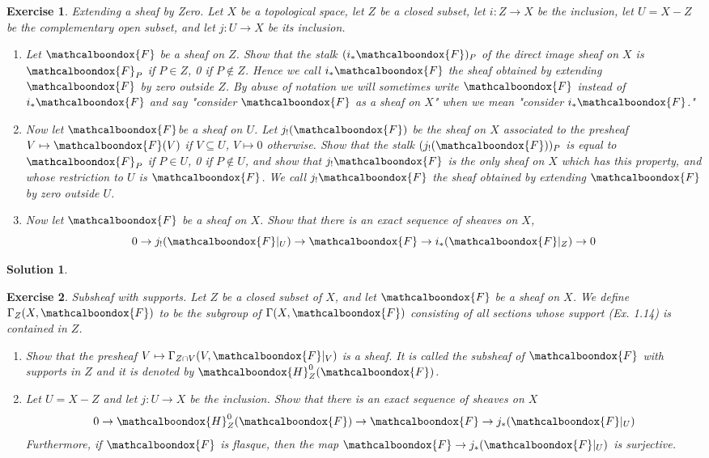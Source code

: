 \documentclass[12pt]{article}
\newtheorem{ex}{Exercise}[section]
\theoremstyle{definition}
\newtheorem*{sol}{Solution}
\newcommand{\sF}{\ensuremath{\mathcalboondox{F}}}
\newcommand{\sH}{\ensuremath{\mathcalboondox{H}}}
\begin{document}
\begin{ex}
	Extending a sheaf by Zero. Let $X$ be a topological space, let $Z$ be a closed subset, let $i: Z \to X$ be the inclusion, let $U = X-Z$ be the complementary open subset, and let $j: U \to X$ be its inclusion.

	\begin{enumerate}[label=\alph*)]
		\item Let $\sF$ be a sheaf on $Z$. Show that the stalk $(i_{*} \sF)_P$ of the direct image sheaf on $X$ is $\sF_P$ if $P \in Z$, 0 if $P \notin Z$. Hence we call $i_{*} \sF$ the sheaf obtained by extending $\sF$ by zero outside $Z$. By abuse of notation we will sometimes write $\sF$ instead of $i_{*}\sF$ and say "consider $\sF$ as a sheaf on $X$" when we mean "consider $i_{*} \sF$."

		\item Now let \sF be a sheaf on $U$. Let $j_{!}(\sF)$ be the sheaf on $X$ associated to the presheaf $V \mapsto \sF(V)$ if $V \subseteq U$, $V \mapsto 0$ otherwise. Show that the stalk $(j_{!}(\sF))_P$ is equal to $\sF_P$ if $P \in U$, 0 if $P \notin U$, and show that $j_{!}\sF$ is the only sheaf on $X$ which has this property, and whose restriction to $U$ is $\sF$. We call $j_{!}\sF$ the sheaf obtained by extending $\sF$ by zero outside $U$.

		\item Now let $\sF$ be a sheaf on $X$. Show that there is an exact sequence of sheaves on $X$,
		\[
			0 \to j_{!}(\sF|_{U}) \to \sF \to i_{*}(\sF|_{Z}) \to 0
		\]
	\end{enumerate}
\end{ex}

\begin{sol}

\end{sol}

\begin{ex}
	Subsheaf with supports. Let $Z$ be a closed subset of $X$, and let $\sF$ be a sheaf on $X$. We define $\Gamma_Z(X, \sF)$ to be the subgroup of $\Gamma(X,\sF)$ consisting of all sections whose support (Ex. 1.14) is contained in $Z$.
	\begin{enumerate}[label=\alph*)]
		\item Show that the presheaf $V \mapsto \Gamma_{Z \cap V}(V, \sF|_V)$ is a sheaf. It is called the subsheaf of $\sF$ with supports in $Z$ and it is denoted by $\sH^{0}_Z(\sF)$.

		\item Let $U = X-Z$ and let $j: U \to X$ be the inclusion. Show that there is an exact sequence of sheaves on $X$
		\[
		 0 \to \sH^{0}_Z(\sF) \to \sF \to j_{*}(\sF|_U)
		\]
		Furthermore, if $\sF$ is flasque, then the map $\sF \to j_{*}(\sF|_U)$ is surjective.
	\end{enumerate}
\end{ex}
\end{document}

